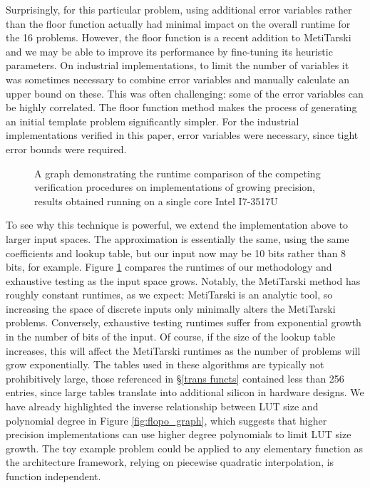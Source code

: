 \documentclass{fac}
\begin{document}
Surprisingly, for this particular problem, using additional error variables rather than the floor function actually had minimal impact on the overall runtime for the 16 problems. However, the floor function is a recent addition to MetiTarski and we may be able to improve its performance by fine-tuning its heuristic parameters. On industrial implementations, to limit the number of variables it was sometimes necessary to combine error variables and manually calculate an upper bound on these. This was often challenging: some of the error variables can be highly correlated. The floor function method makes the process of generating an initial template problem significantly simpler. For the industrial implementations verified in this paper, error variables were necessary, since tight error bounds were required.
\begin{figure}
\centering
\scalebox{0.9}{}
\caption{A graph demonstrating the runtime comparison of the competing verification procedures on implementations of growing precision, results obtained running on a single core Intel I7-3517U \label{runtime_graph}}
\end{figure}

To see why this technique is powerful, we extend the implementation above to larger input spaces. The approximation is essentially the same, using the same coefficients and lookup table, but our input now may be 10 bits rather than 8 bits, for example. Figure \ref{runtime_graph} compares the runtimes of our methodology and exhaustive testing as the input space grows. Notably, the MetiTarski method has roughly constant runtimes, as we expect: MetiTarski is an analytic tool, so increasing the space of discrete inputs only minimally alters the MetiTarski problems. Conversely, exhaustive testing runtimes suffer from exponential growth in the number of bits of the input. Of course, if the size of the lookup table increases, this will affect the MetiTarski runtimes as the number of problems will grow exponentially. The tables used in these algorithms are typically not prohibitively large, those referenced in \S \ref{trans functs} contained less than 256 entries, since large tables translate into additional silicon in hardware designs. We have already highlighted the inverse relationship between LUT size and polynomial degree in Figure \ref{fig:flopo_graph}, which suggests that higher precision implementations can use higher degree polynomials to limit LUT size growth. The toy example problem could be applied to any elementary function as the architecture framework, relying on piecewise quadratic interpolation, is function independent.
\end{document}

